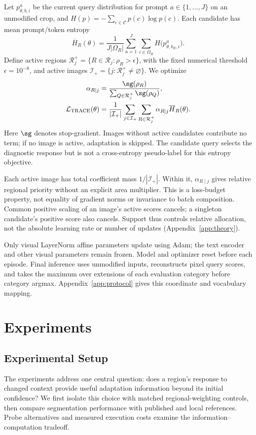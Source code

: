 \documentclass[letterpaper]{article}
\begin{document}
Let $p^a_{\theta,b,i}$ be the current query distribution for prompt $a\in\{1,\ldots,J\}$ on an unmodified crop, and $H(p)=-\sum_{c\in\mathcal C}p(c)\log p(c)$. Each candidate has mean prompt/token entropy
\begin{equation}
\overline H_R(\theta)=\frac{1}{J|\Omega_R|}
\sum_{a=1}^{J}\sum_{i\in\Omega_R}H\bigl(p^a_{\theta,b_R,i}\bigr).
\end{equation}
Define active regions $\mathcal R_j^+=\{R\in\mathcal R_j:\rho_R>\epsilon\}$, with the fixed numerical threshold $\epsilon=10^{-8}$, and active images $\mathcal I_+=\{j:\mathcal R_j^+\neq\varnothing\}$. We optimize
\begin{align}
\alpha_{R\mid j}&=\frac{\sg(\rho_R)}
{\sum_{Q\in\mathcal R_j^+}\sg(\rho_Q)},\\
\mathcal L_{\mathrm{TRACE}}(\theta)&=\frac{1}{|\mathcal I_+|}\sum_{j\in\mathcal I_+}
\sum_{R\in\mathcal R_j^+}\alpha_{R\mid j}\overline H_R(\theta).
\label{eq:loss}
\end{align}
Here $\sg$ denotes stop-gradient. Images without active candidates contribute no term; if no image is active, adaptation is skipped. The candidate query selects the diagnostic response but is not a cross-entropy pseudo-label for this entropy objective.

Each active image has total coefficient mass $1/|\mathcal I_+|$. Within it, $\alpha_{R\mid j}$ gives relative regional priority without an explicit area multiplier. This is a loss-budget property, not equality of gradient norms or invariance to batch composition. Common positive scaling of an image's active scores cancels; a singleton candidate's positive score also cancels. Support thus controls relative allocation, not the absolute learning rate or number of updates (Appendix~\ref{app:theory}).

Only visual LayerNorm affine parameters update using Adam; the text encoder and other visual parameters remain frozen. Model and optimizer reset before each episode. Final inference uses unmodified inputs, reconstructs pixel query scores, and takes the maximum over extensions of each evaluation category before category argmax. Appendix~\ref{app:protocol} gives this coordinate and vocabulary mapping.

\section{Experiments}
\subsection{Experimental Setup}
The experiments address one central question: does a region's response to changed context provide useful adaptation information beyond its initial confidence? We first isolate this choice with matched regional-weighting controls, then compare segmentation performance with published and local references. Probe alternatives and measured execution costs examine the information--computation tradeoff.
\end{document}
